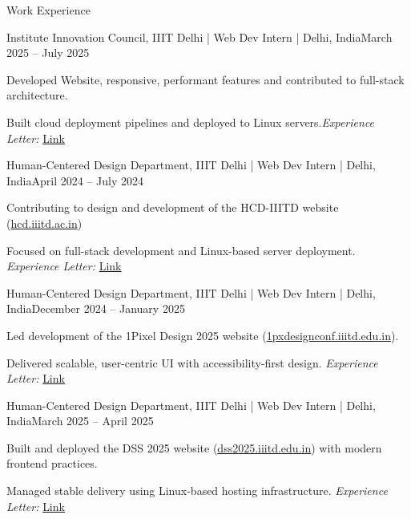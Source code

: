 \documentclass[10pt]{resume}
\begin{document}
\begin{rSection}{Work Experience}

\begin{rSubsection}{Institute Innovation Council, IIIT Delhi | Web Dev Intern | Delhi, India}{March 2025 -- July 2025}
    \item Developed Website, responsive, performant features and contributed to full-stack architecture.
    \item Built cloud deployment pipelines and deployed to Linux servers.\textit{Experience Letter:} \href{https://drive.google.com/file/d/15J8h-KHd-D_vZ8FEkdgwQNcVEaaCNLBa/view}{Link}
\end{rSubsection}

\begin{rSubsection}{Human-Centered Design Department, IIIT Delhi | Web Dev Intern | Delhi, India}{April 2024 -- July 2024}
    \item Contributing to design and development of the HCD-IIITD website (\href{https://hcd.iiitd.ac.in/}{hcd.iiitd.ac.in})
    \item Focused on full-stack development and Linux-based server deployment. \textit{Experience Letter:} \href{https://drive.google.com/file/d/1ZBmdpn35tOQ6O-hA4DlZQFGS6P-6t2TZ/view?usp=sharing}{Link}
\end{rSubsection}

\begin{rSubsection}{Human-Centered Design Department, IIIT Delhi | Web Dev Intern | Delhi, India}{December 2024 -- January 2025}
    \item Led development of the 1Pixel Design 2025 website (\href{https://1pxdesignconf.iiitd.edu.in}{1pxdesignconf.iiitd.edu.in}).
    \item Delivered scalable, user-centric UI with accessibility-first design. \textit{Experience Letter:} \href{https://drive.google.com/file/d/1ZBmdpn35tOQ6O-hA4DlZQFGS6P-6t2TZ/view?usp=sharing}{Link}
\end{rSubsection}

\begin{rSubsection}{Human-Centered Design Department, IIIT Delhi | Web Dev Intern | Delhi, India}{March 2025 -- April 2025}
    \item Built and deployed the DSS 2025 website (\href{https://dss2025.iiitd.edu.in}{dss2025.iiitd.edu.in}) with modern frontend practices.
    \item Managed stable delivery using Linux-based hosting infrastructure. \textit{Experience Letter:} \href{https://drive.google.com/file/d/1ZBmdpn35tOQ6O-hA4DlZQFGS6P-6t2TZ/view?usp=sharing}{Link}
\end{rSubsection}


\end{rSection}
\end{document}

